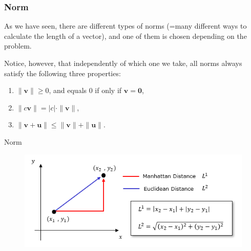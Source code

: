 \documentclass{beamer}
\newcommand{\vv}{\mathbf{v}}
\newcommand{\vu}{\mathbf{u}}
\begin{document}
\begin{frame}
  \frametitle{Norm}

As we have seen, there are different types of norms   (=many different ways to calculate  the length of a vector), and one of them is chosen depending  on the problem.

\pause

\bigskip 


Notice, however, that independently of which one we take, all norms always satisfy the following three properties:
  

\begin{enumerate}
    \item $\|\vv\|\ge 0$, and equals 0 if only if $\vv=\mathbf{0}$,
    \item $\|c\vv\| = |c|\cdot \|\vv\|$,
    \item $\|\vv+\vu\| \le \|\vv\|+\|\vu\|$.
\end{enumerate}


\begin{figure}
    \centering
\end{figure}


\end{frame}

\begin{frame}{Norm}
    \begin{figure}
        \centering
        \includegraphics[width=\linewidth]{l1 l2 norms.png}
        
        
    \end{figure}
\end{frame}
\end{document}
